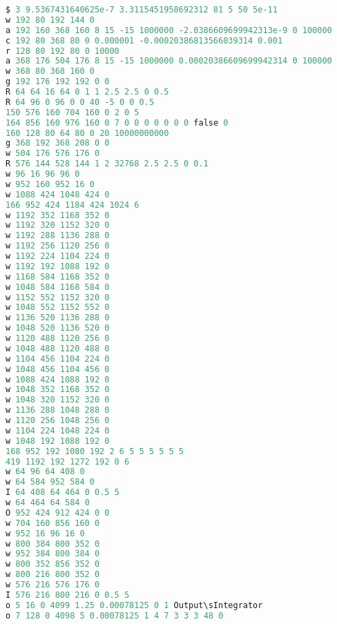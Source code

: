 \begin{lstlisting}[language=Verilog]
$ 3 9.5367431640625e-7 3.3115451958692312 81 5 50 5e-11
w 192 80 192 144 0
a 192 160 368 160 8 15 -15 1000000 -2.0386609699942313e-9 0 100000
c 192 80 368 80 0 0.000001 -0.00020386813566039314 0.001
r 128 80 192 80 0 10000
a 368 176 504 176 8 15 -15 1000000 0.00020386609699942314 0 100000
w 368 80 368 160 0
g 192 176 192 192 0 0
R 64 64 16 64 0 1 1 2.5 2.5 0 0.5
R 64 96 0 96 0 0 40 -5 0 0 0.5
150 576 160 704 160 0 2 0 5
164 856 160 976 160 0 7 0 0 0 0 0 0 0 false 0
160 128 80 64 80 0 20 10000000000
g 368 192 368 208 0 0
w 504 176 576 176 0
R 576 144 528 144 1 2 32768 2.5 2.5 0 0.1
w 96 16 96 96 0
w 952 160 952 16 0
w 1088 424 1048 424 0
166 952 424 1184 424 1024 6
w 1192 352 1168 352 0
w 1192 320 1152 320 0
w 1192 288 1136 288 0
w 1192 256 1120 256 0
w 1192 224 1104 224 0
w 1192 192 1088 192 0
w 1168 584 1168 352 0
w 1048 584 1168 584 0
w 1152 552 1152 320 0
w 1048 552 1152 552 0
w 1136 520 1136 288 0
w 1048 520 1136 520 0
w 1120 488 1120 256 0
w 1048 488 1120 488 0
w 1104 456 1104 224 0
w 1048 456 1104 456 0
w 1088 424 1088 192 0
w 1048 352 1168 352 0
w 1048 320 1152 320 0
w 1136 288 1048 288 0
w 1120 256 1048 256 0
w 1104 224 1048 224 0
w 1048 192 1088 192 0
168 952 192 1080 192 2 6 5 5 5 5 5 5
419 1192 192 1272 192 0 6
w 64 96 64 408 0
w 64 584 952 584 0
I 64 408 64 464 0 0.5 5
w 64 464 64 584 0
O 952 424 912 424 0 0
w 704 160 856 160 0
w 952 16 96 16 0
w 800 384 800 352 0
w 952 384 800 384 0
w 800 352 856 352 0
w 800 216 800 352 0
w 576 216 576 176 0
I 576 216 800 216 0 0.5 5
o 5 16 0 4099 1.25 0.00078125 0 1 Output\sIntegrator
o 7 128 0 4098 5 0.00078125 1 4 7 3 3 3 48 0
\end{lstlisting}
